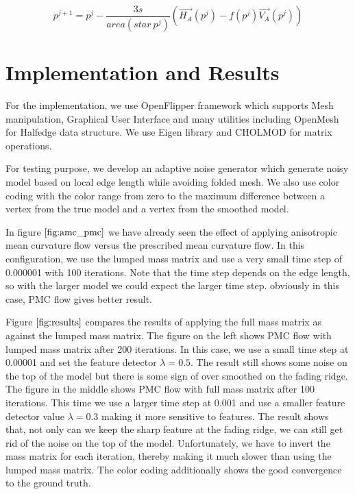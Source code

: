 \documentclass[11pt]{article}
\begin{document}
\begin{equation}
p^{j+1} = p^{j} - \dfrac{3s}{area(star\ p^j)}(\vec{H_A}(p^j) - f(p^j)\vec{V_A}(p^j))
\end{equation}

\section{Implementation and Results}

For the implementation, we use OpenFlipper framework \cite{springerlink:10.1007} which supports Mesh manipulation, Graphical User Interface and many utilities including OpenMesh \cite{Botsch02openmesh-} for Halfedge data structure. We use Eigen library \cite{eigenweb} and CHOLMOD \cite{Davis:2009:DSS:1462173.1462176} for matrix operations.

For testing purpose, we develop an adaptive noise generator which generate noisy model based on local edge length while avoiding folded mesh. We also use color coding with the color range from zero to the maximum difference between a vertex from the true model and a vertex from the smoothed model.

In figure $\ref{fig:amc_pmc}$ we have already seen the effect of applying anisotropic mean curvature flow versus the prescribed mean curvature flow. In this configuration, we use the lumped mass matrix and use a very small time step of 0.000001 with 100 iterations. Note that the time step depends on the edge length, so with the larger model we could expect the larger time step. obviously in this case, PMC flow gives better result.

Figure $\ref{fig:results}$ compares the results of applying the full mass matrix as against the lumped mass matrix. The figure on the left shows PMC flow with lumped mass matrix after 200 iterations. In this case, we use a small time step at 0.00001 and set the feature detector $\lambda = 0.5$. The result still shows some noise on the top of the model but there is some sign of over smoothed on the fading ridge. The figure in the middle shows PMC flow with full mass matrix after 100 iterations. This time we use a larger time step at 0.001 and use a smaller feature detector value $\lambda = 0.3$ making it more sensitive to features. The result shows that, not only can we keep the sharp feature at the fading ridge, we can still get rid of the noise on the top of the model. Unfortunately, we have to invert the mass matrix for each iteration, thereby making it much slower than using the lumped mass matrix. The color coding additionally shows the good convergence to the ground truth.
\end{document}
